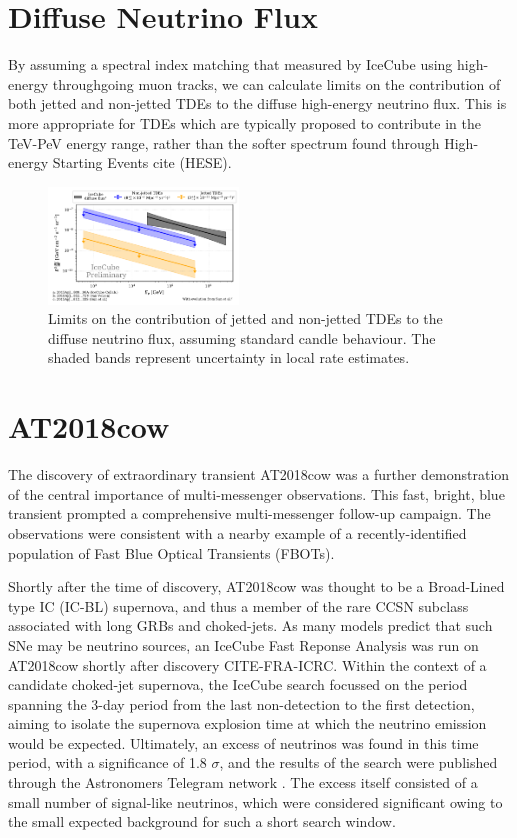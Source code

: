 \documentclass[twocolumn, tighten, linenumbers]{aastex62}
\begin{document}
\section{Diffuse Neutrino Flux}
\label{sec:DiffuseNeutrinoFlux}

By assuming a spectral index matching that measured by IceCube using high-energy throughgoing muon tracks, we can calculate limits on the contribution of both jetted and non-jetted TDEs to the diffuse high-energy neutrino flux. This is more appropriate for TDEs which are typically proposed to contribute in the TeV-PeV energy range, rather than the softer spectrum found through High-energy Starting Events cite (HESE). 

\begin{figure}[!ht]
	\centering \includegraphics[width=0.45\textwidth]{figures/diffuse_flux_global_fit}
	\caption{Limits on the contribution of jetted and non-jetted TDEs to the diffuse neutrino flux, assuming standard candle behaviour. The shaded bands represent uncertainty in local rate estimates.}
	\label{fig:DiffuseFlux}
\end{figure}

\section{AT2018cow}


The discovery of extraordinary transient AT2018cow was a further demonstration of the central importance of multi-messenger observations.  This fast, bright, blue transient prompted a comprehensive multi-messenger follow-up campaign. The observations were consistent with a nearby example of a recently-identified population of Fast Blue Optical Transients (FBOTs). 

Shortly after the time of discovery, AT2018cow was thought to be a Broad-Lined type IC (IC-BL) supernova, and thus a member of the rare CCSN subclass associated with long GRBs and choked-jets. As many models predict that such SNe may be neutrino sources, an IceCube Fast Reponse Analysis was run on AT2018cow shortly after discovery CITE-FRA-ICRC. Within the context of a candidate choked-jet supernova, the IceCube search focussed on the period spanning the 3-day period from the last non-detection to the first detection, aiming to isolate the supernova explosion time at which the neutrino emission would be expected. Ultimately, an excess of neutrinos was found in this time period, with a significance of 1.8 $\sigma$, and the results of the search were published through the Astronomers Telegram network \cite{2018ATel11785....1B}. The excess itself consisted of a small number of signal-like neutrinos, which were considered significant owing to the small expected background for such a short search window.
\end{document}
